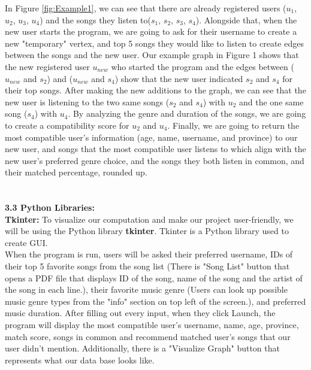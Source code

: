 \documentclass[fontsize=11pt]{article}
\numberwithin{equation}{section}
\theoremstyle{plain} %
\theoremstyle{definition}
\theoremstyle{remark}
\begin{document}
In Figure \ref{fig:Example1}, we can see that there are already registered users ($u_1$, $u_2$, $u_3$, $u_4$) and the songs they listen to($s_1$, $s_2$, $s_3$, $s_4$). Alongside that, when the new user starts the program, we are going to ask for their username to create a new "temporary" vertex, and top 5 songs they would like to listen to create edges between the songs and the new user. Our example graph in Figure 1 shows that the new registered user $u_{new}$ who started the program and the edges between ($u_{new}$ and $s_2$) and ($u_{new}$ and $s_4$) show that the new user indicated $s_2$ and $s_4$ for their top songs. After making the new additions to the graph, we can see that the new user is listening to the two same songs ($s_2$ and $s_4$) with $u_2$ and the one same song ($s_4$) with $u_4$. By analyzing the genre and duration of the songs, we are going to create a compatibility score for $u_2$ and $u_4$. Finally, we are going to return the most compatible user's information (age, name, username, and province) to our new user, and songs that the most compatible user listens to which align with the new user's preferred genre choice, and the songs they both listen in common, and their matched percentage, rounded up.

\section*{}
\textbf{3.3 Python Libraries:}
\\

\textbf{Tkinter:}
To visualize our computation and make our project user-friendly, we will be using the Python library \textbf{tkinter}. Tkinter is a Python library used to create GUI. 
\\

When the program is run, users will be asked their preferred username, 
IDs of their top 5 favorite songs from the song list (There is "Song List" button that opens a PDF file that displays ID of the song, name of the song and the artist of the song in each line.), their favorite music genre (Users can look up possible music genre types from the "info" section on top left of the screen.), and preferred music duration. After filling out every input, when they click Launch, the program will display the most compatible user's username, name, age, province, match score, songs in common and recommend matched user's songs that our user didn't mention.
Additionally, there is a "Visualize Graph" button that represents what our data base looks like.
\\
\end{document}

